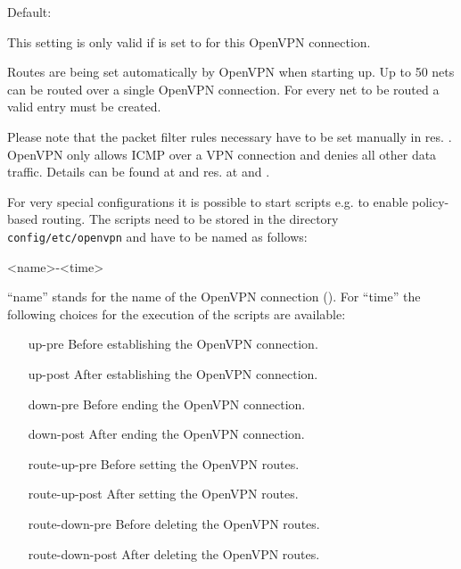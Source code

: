 \begin{description}

  Default: 

  This setting is only valid if  
  is set to  for this OpenVPN connection.

  Routes are being set automatically by OpenVPN when starting up. 
  Up to 50 nets can be routed over a single OpenVPN connection. 
  For every net to be routed a valid  entry
  must be created.

  Please note that the packet filter rules necessary have to be set manually in 
    res.
   .
  OpenVPN only allows ICMP over a VPN connection and denies all other 
  data traffic. Details can be found at 
   and
   res.
  at
   and
  .
  
  For very special configurations it is possible to start scripts
  e.g. to enable policy-based routing. The scripts need to be stored
  in the directory \texttt{config/etc/openvpn} and have to be named
  as follows:
  
  
\begin{example}
  <name>-<time>
\end{example}

  ``name'' stands for the name of the OpenVPN connection
  (). For ``time''  the following
   choices for the execution of the scripts are available:

  \begin{itemize}
    \item [up-pre] Before establishing the OpenVPN connection.
    \item [up-post] After establishing the OpenVPN connection.
    \item [down-pre] Before ending the OpenVPN connection.
    \item [down-post] After ending the OpenVPN connection.
    \item [route-up-pre] Before setting the OpenVPN routes.
    \item [route-up-post] After setting the OpenVPN routes.
    \item [route-down-pre] Before deleting the OpenVPN routes.
    \item [route-down-post] After deleting the OpenVPN routes.
  \end{itemize}


\end{description}
